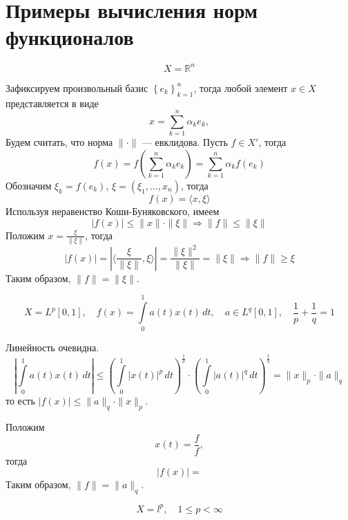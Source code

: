 \documentclass[12pt]{article}
\newtheorem{example}{\hskip\parindent Пример}%
\begin{document}
	\section{Примеры вычисления норм функционалов}
	\begin{example}
		\begin{equation*}
			X=\mathbb{R}^n
		\end{equation*}
	\end{example}
	Зафиксируем произвольный базис $\left\{e_k\right\}_{k=1}^{n}$, тогда любой элемент $x\in X$ представляется в виде
	\begin{equation*}
		x=\sum\limits_{k=1}^{n}\alpha_k e_k,
	\end{equation*}
	Будем считать, что норма $\|\cdot\|$ --- евклидова. Пусть $f\in X'$, тогда
	\begin{equation*}
		f(x)=f\left(\sum\limits_{k=1}^{n}\alpha_k e_k\right)=\sum\limits_{k=1}^{n}\alpha_k f(e_k)
	\end{equation*}
	Обозначим $\xi_k=f(e_k)$, $\xi=(\xi_1,\dots, x_n)$, тогда
	\begin{equation*}
		f(x)=\langle x,\xi\rangle
	\end{equation*}
	Используя неравенство Коши-Буняковского, имеем
	\begin{equation*}
		|f(x)|\leqslant\|x\|\cdot\|\xi\| \Longrightarrow \|f\|\leqslant\|\xi\|
	\end{equation*}
	Положим $x=\frac{\xi}{\|\xi\|}$, тогда
	\begin{equation*}
		|f(x)|=\left|\langle\frac{\xi}{\|\xi\|},\xi\rangle\right|=\frac{\|\xi\|^2}{\|\xi\|}=\|\xi\| \Longrightarrow \|f\|\geqslant\xi
	\end{equation*}
	Таким образом, $\|f\|=\|\xi\|$.
	\begin{example}
		\begin{equation*}
			X=L^p[0,1], \quad f(x)=\int\limits_{0}^{1}a(t)x(t)\,dt, \quad a\in L^q[0,1], \quad \frac{1}{p}+\frac{1}{q}=1
		\end{equation*}
	\end{example}
Линейность очевидна.
\begin{equation*}
	\left|\int\limits_{0}^{1}a(t)x(t)\,dt\right|\leqslant\left(\int\limits_{0}^{1}|x(t)|^p\,dt\right)^{\frac{1}{p}}\cdot\left(\int\limits_{0}^{1}|a(t)|^q\,dt\right)^{\frac{1}{q}}=\|x\|_p\cdot\|a\|_q
\end{equation*}
то есть $|f(x)|\leqslant \|a\|_q\cdot \|x\|_p$.

Положим
\begin{equation*}
	x(t)=\frac{f}{f},
\end{equation*}
тогда
\begin{equation*}
	|f(x)|=
\end{equation*}
Таким образом, $\|f\|=\|a\|_q$.
\begin{example}
	\begin{equation*}
		X=l^p, \quad 1\leqslant p<\infty
	\end{equation*}
\end{example}
\end{document}
